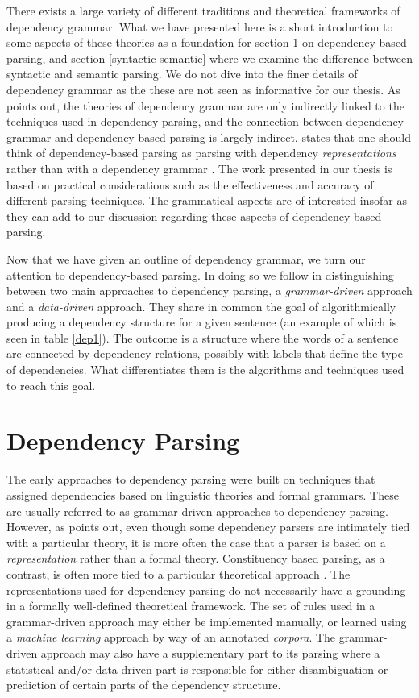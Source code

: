 There exists a large variety of different traditions and theoretical frameworks of dependency grammar. What we have presented here is a short introduction to some aspects of these theories as a foundation for section \ref{parsing} on dependency-based parsing, and section \ref{syntactic-semantic} where we examine the difference between syntactic and semantic parsing. We do not dive into the finer details of dependency grammar as the these are not seen as informative for our thesis. As \citeauthor{Niv:05} points out, the theories of dependency grammar are only indirectly linked to the techniques used in dependency parsing, and the connection between dependency grammar and dependency-based parsing is largely indirect. \citeauthor{Niv:05} states that one should think of dependency-based parsing as parsing with dependency \textit{representations} rather than with a dependency grammar \cite{Niv:05}. The work presented in our thesis is based on practical considerations such as the effectiveness and accuracy of different parsing techniques. The grammatical aspects are of interested insofar as they can add to our discussion regarding these aspects of dependency-based parsing.

Now that we have given an outline of dependency grammar, we turn our attention to dependency-based parsing. In doing so we follow  in distinguishing between two main approaches to dependency parsing, a \textit{grammar-driven} approach and a \textit{data-driven} approach. They share in common the goal of algorithmically producing a dependency structure for a given sentence (an example of which is seen in table \ref{dep1}). The outcome is a structure where the words of a sentence are connected by dependency relations, possibly with labels that define the type of dependencies. What differentiates them is the algorithms and techniques used to reach this goal.

\section{Dependency Parsing}
\label{parsing}

The early approaches to dependency parsing were built on techniques that assigned dependencies based on linguistic theories and formal grammars. These are usually referred to as grammar-driven approaches to dependency parsing. However, as \citeauthor{Niv:05} points out, even though some dependency parsers are intimately tied with a particular theory, it is more often the case that a parser is based on a \textit{representation} rather than a formal theory. Constituency based parsing, as a contrast, is often more tied to a particular theoretical approach \cite{Niv:05}. The representations used for dependency parsing do not necessarily have a grounding in a formally well-defined theoretical framework. The set of rules used in a grammar-driven approach may either be implemented manually, or learned using a \textit{machine learning} approach by way of an annotated \textit{corpora}. The grammar-driven approach may also have a supplementary part to its parsing where a statistical and/or data-driven part is responsible for either disambiguation or prediction of certain parts of the dependency structure.

